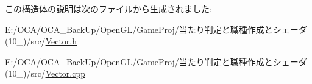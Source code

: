 この構造体の説明は次のファイルから生成されました\-:\begin{DoxyCompactItemize}
\item 
E\-:/\-O\-C\-A/\-O\-C\-A\-\_\-\-Back\-Up/\-Open\-G\-L/\-Game\-Proj/当たり判定と職種作成とシェーダ(10\-\_)/src/\hyperlink{_vector_8h}{Vector.\-h}\item 
E\-:/\-O\-C\-A/\-O\-C\-A\-\_\-\-Back\-Up/\-Open\-G\-L/\-Game\-Proj/当たり判定と職種作成とシェーダ(10\-\_)/src/\hyperlink{_vector_8cpp}{Vector.\-cpp}\end{DoxyCompactItemize}

